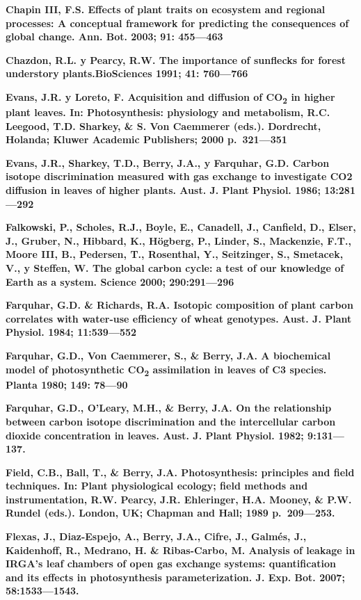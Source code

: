 \documentclass[
]{article}
\begin{document}
\textbf{Chapin III, F.S. Effects of plant traits on ecosystem and
regional processes: A conceptual framework for predicting the
consequences of global change. Ann. Bot. 2003; 91: 455---463}

\textbf{Chazdon, R.L. y Pearcy, R.W. The importance of sunflecks for
forest understory plants.BioSciences 1991; 41: 760---766}

\textbf{Evans, J.R. y Loreto, F. Acquisition and diffusion of
CO\textsubscript{2} in higher plant leaves. In: Photosynthesis:
physiology and metabolism, R.C. Leegood, T.D. Sharkey, \& S. Von
Caemmerer (eds.). Dordrecht, Holanda; Kluwer Academic Publishers; 2000
p.~321---351}

\textbf{Evans, J.R., Sharkey, T.D., Berry, J.A., y Farquhar, G.D. Carbon
isotope discrimination measured with gas exchange to investigate CO2
diffusion in leaves of higher plants. Aust. J. Plant Physiol. 1986;
13:281---292}

\textbf{Falkowski, P., Scholes, R.J., Boyle, E., Canadell, J., Canfield,
D., Elser, J., Gruber, N., Hibbard, K., Högberg, P., Linder, S.,
Mackenzie, F.T., Moore III, B., Pedersen, T., Rosenthal, Y., Seitzinger,
S., Smetacek, V., y Steffen, W. The global carbon cycle: a test of our
knowledge of Earth as a system. Science 2000; 290:291---296}

\textbf{Farquhar, G.D. \& Richards, R.A. Isotopic composition of plant
carbon correlates with water-use efficiency of wheat genotypes. Aust. J.
Plant Physiol. 1984; 11:539---552}

\textbf{Farquhar, G.D., Von Caemmerer, S., \& Berry, J.A. A biochemical
model of photosynthetic CO\textsubscript{2} assimilation in leaves of C3
species. Planta 1980; 149: 78---90}

\textbf{Farquhar, G.D., O'Leary, M.H., \& Berry, J.A. On the
relationship between carbon isotope discrimination and the intercellular
carbon dioxide concentration in leaves. Aust. J. Plant Physiol. 1982;
9:131---137.}

\textbf{Field, C.B., Ball, T., \& Berry, J.A. Photosynthesis: principles
and field techniques. In: Plant physiological ecology; field methods and
instrumentation, R.W. Pearcy, J.R. Ehleringer, H.A. Mooney, \& P.W.
Rundel (eds.). London, UK; Chapman and Hall; 1989 p.~209---253.}

\textbf{Flexas, J., Diaz-Espejo, A., Berry, J.A., Cifre, J., Galmés, J.,
Kaidenhoff, R., Medrano, H. \& Ribas-Carbo, M. Analysis of leakage in
IRGA's leaf chambers of open gas exchange systems: quantification and
its effects in photosynthesis parameterization. J. Exp. Bot. 2007;
58:1533---1543.}
\end{document}
